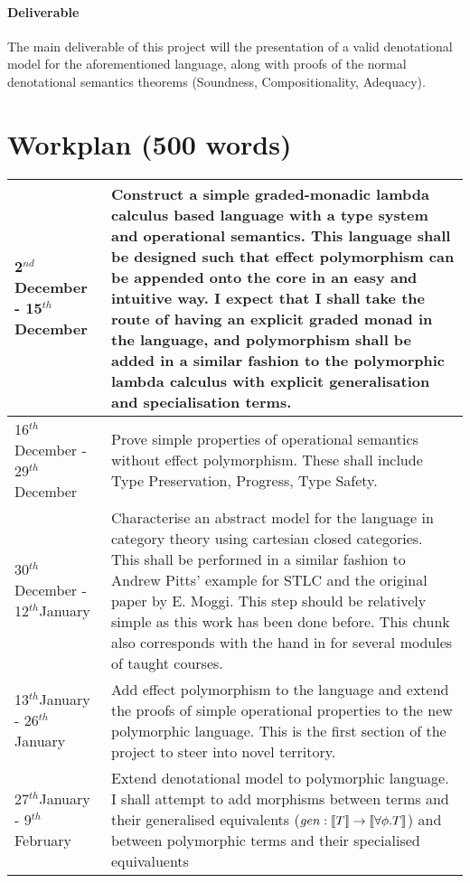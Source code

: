 \documentclass[11pt]{article}
\newcommand{\deno}[1]{{\bf [\![}#1{\bf ]\!]}}
\renewcommand{\th}{$^{th}$}
\newcommand{\nd}{$^{nd}$}
\begin{document}
\paragraph{Deliverable}{
The main deliverable of this project will the presentation of a valid denotational model for the aforementioned language, along with proofs of the normal denotational semantics theorems (Soundness, Compositionality, Adequacy).
}



\section{Workplan (500 words)}

\begin{tabular}{|p{6cm}||p{10cm}|}
\hline
	2\nd December - 15\th December & Construct a simple graded-monadic lambda calculus based language with a type system and operational semantics. This language shall be designed such that effect polymorphism can be appended onto the core in an easy and intuitive way. I expect that I shall take the route of having an explicit graded monad in the language, and polymorphism shall be added in a similar fashion to the polymorphic lambda calculus with explicit generalisation and specialisation terms.\\\hline
	16\th December - 29\th December & Prove simple properties of operational semantics without effect polymorphism. These shall include Type Preservation, Progress, Type Safety.\\\hline
	30\th December - 12\th January & Characterise an abstract model for the language in category theory using cartesian closed categories. This shall be performed in a similar fashion to Andrew Pitts' example for STLC and the original paper by E. Moggi. This step should be relatively simple as this work has been done before. This chunk also corresponds with the hand in for several modules of taught courses.  \\\hline
	13\th January - 26\th January &  Add effect polymorphism to the language and extend the proofs of simple operational properties to the new polymorphic language. This is the first section of the project to steer into novel territory. \\\hline
	27\th January - 9\th February &  Extend denotational model to polymorphic language. I shall attempt to add morphisms between terms and their generalised equivalents ($gen: \deno{T} \rightarrow \deno{\forall \phi. T} $) and between polymorphic terms and their specialised equivaluents 

\end{tabular}
\end{document}
